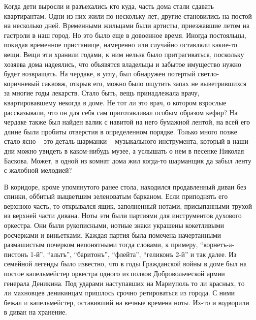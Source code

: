 Когда дети выросли и разъехались кто куда, часть дома стали сдавать
квартирантам. Одни из них жили по нескольку лет, другие становились на постой
на несколько дней. Временными жильцами были артисты, приезжавшие летом на
гастроли в наш город. Но это было еще в довоенное время. Иногда постояльцы,
покидая временное пристанище, намеренно или случайно оставляли какие-то вещи.
Вещи эти хранили годами, к ним нельзя было притрагиваться, поскольку хозяева
дома надеялись, что объявятся владельцы и забытое имущество нужно будет
возвращать. На чердаке, в углу, был обнаружен потертый светло-коричневый
саквояж, открыв его, можно было ощутить запах не выветрившихся за многие годы
лекарств. Стало быть, вещь принадлежала врачу, квартировавшему некогда в доме.
Не тот ли это врач, о котором взрослые рассказывали, что он для себя сам
приготавливал особым образом кефир?  На чердаке также был найден валик с
навитой на него бумажной лентой, на всей его длине были пробиты отверстия в
определенном порядке. Только много позже стало ясно – это деталь шарманки –
музыкального инструмента, который в наши дни можно увидеть в каком-нибудь
музее, а услышать о нем в песенке Николая Баскова. Может, в одной из комнат
дома жил когда-то шарманщик да забыл ленту с жалобной мелодией?

В коридоре, кроме упомянутого ранее стола, находился продавленный диван без
спинки, оббитый выцветшим зеленоватым барканом. Если приподнять его верхнюю
часть, то открывался ящик, заполненный нотами, присыпанными трухой из верхней
части дивана. Ноты эти были партиями для инструментов духового оркестра. Они
были рукописными, нотные знаки украшены кокетливыми росчерками и виньетками.
Каждая партия была помечена начертанными размашистым почерком непонятными тогда
словами, к примеру, \enquote{корнетъ-а-пистонъ 1-й}, \enquote{альтъ}, \enquote{баритонъ}, \enquote{флейта},
\enquote{геликонъ 2-й} и так далее. Из семейной легенды было известно, что в годы
Гражданской войны в доме был на постое капельмейстер  оркестра одного из полков
Добровольческой армии генерала Деникина. Под ударами наступавших на Мариуполь
то ли красных, то ли махновцев деникинцам пришлось срочно ретироваться из
города. С ними бежал и капельмейстер, оставивший на вечные времена ноты. Их-то
и водворили в диван на хранение.

